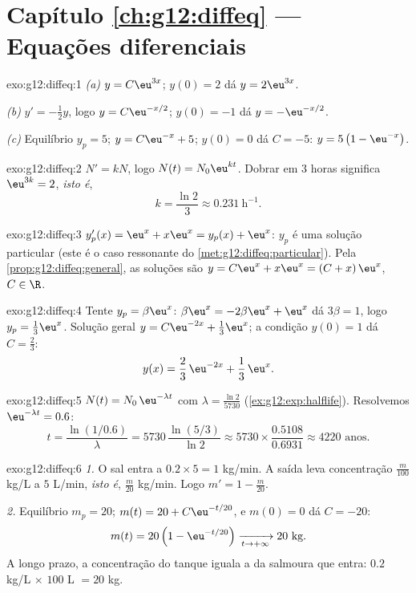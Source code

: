 \section*{Capítulo \ref{ch:g12:diffeq} --- Equações diferenciais}

\begin{solution}{exo:g12:diffeq:1}
\emph{(a)} $y = C\eu^{3x}$; $y(0) = 2$ dá $y = 2\eu^{3x}$.

\emph{(b)} $y' = -\frac12 y$, logo $y = C\eu^{-x/2}$; $y(0) = -1$ dá
$y = -\eu^{-x/2}$.

\emph{(c)} Equilíbrio $y_p = 5$; $y = C\eu^{-x} + 5$; $y(0) = 0$ dá
$C = -5$: $y = 5\left(1 - \eu^{-x}\right)$.
\end{solution}

\begin{solution}{exo:g12:diffeq:2}
$N' = kN$, logo $N(t) = N_0 \eu^{kt}$. Dobrar em $3$ horas significa
$\eu^{3k} = 2$, \emph{isto é},
\[
k = \frac{\ln 2}{3} \approx 0.231\ \text{h}^{-1}.
\]
\end{solution}

\begin{solution}{exo:g12:diffeq:3}
$y_p'(x) = \eu^x + x\eu^x = y_p(x) + \eu^x$: $y_p$ é uma solução particular
(este é o caso ressonante do \cref{met:g12:diffeq:particular}). Pela
\cref{prop:g12:diffeq:general}, as soluções são
$y = C\eu^{x} + x\eu^{x} = (C + x)\,\eu^x$, $C \in \R$.
\end{solution}

\begin{solution}{exo:g12:diffeq:4}
Tente $y_p = \beta\eu^x$: $\beta\eu^x = -2\beta\eu^x + \eu^x$ dá
$3\beta = 1$, logo $y_p = \frac13\eu^x$. Solução geral
$y = C\eu^{-2x} + \frac13\eu^{x}$; a condição $y(0) = 1$ dá
$C = \frac23$:
\[
y(x) = \frac{2}{3}\,\eu^{-2x} + \frac{1}{3}\,\eu^{x}.
\]
\end{solution}

\begin{solution}{exo:g12:diffeq:5}
$N(t) = N_0\,\eu^{-\lambda t}$ com $\lambda = \frac{\ln 2}{5730}$
(\cref{ex:g12:exp:halflife}). Resolvemos $\eu^{-\lambda t} = 0.6$:
\[
t = \frac{\ln(1/0.6)}{\lambda} = 5730\,\frac{\ln(5/3)}{\ln 2}
\approx 5730 \times \frac{0.5108}{0.6931} \approx 4220 \text{ anos}.
\]
\end{solution}

\begin{solution}{exo:g12:diffeq:6}
\emph{1.} O sal entra a $0.2 \times 5 = 1$ kg/min. A saída leva
concentração $\frac{m}{100}$ kg/L a $5$ L/min, \emph{isto é},
$\frac{m}{20}$ kg/min. Logo $m' = 1 - \frac{m}{20}$.

\emph{2.} Equilíbrio $m_p = 20$; $m(t) = 20 + C\eu^{-t/20}$, e $m(0) = 0$
dá $C = -20$:
\[
m(t) = 20\left(1 - \eu^{-t/20}\right) \xrightarrow[t\to+\infty]{} 20 \text{ kg}.
\]
A longo prazo, a concentração do tanque iguala a da salmoura que entra:
$0.2$ kg/L $\times$ $100$ L $= 20$ kg.
\end{solution}

